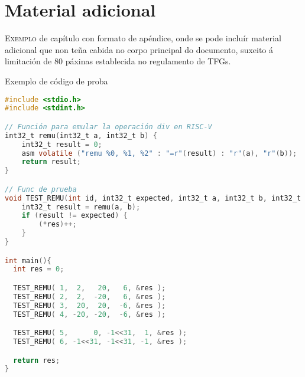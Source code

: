 \chapter{Material adicional}
\label{chap:adicional}

\lettrine{E}{xemplo} de capítulo con formato de apéndice, onde se pode
incluír material adicional que non teña cabida no corpo principal do
documento, suxeito á limitación de 80 páxinas establecida no
regulamento de TFGs.

Exemplo de código de proba

\begin{lstlisting}[language=C]
#include <stdio.h>
#include <stdint.h>

// Función para emular la operación div en RISC-V
int32_t remu(int32_t a, int32_t b) {
    int32_t result = 0;
    asm volatile ("remu %0, %1, %2" : "=r"(result) : "r"(a), "r"(b));
    return result;
}

// Func de prueba
void TEST_REMU(int id, int32_t expected, int32_t a, int32_t b, int32_t *res) {
    int32_t result = remu(a, b); 
    if (result != expected) {
        (*res)++;
    }
}

int main(){
  int res = 0;

  TEST_REMU( 1,  2,   20,   6, &res );
  TEST_REMU( 2,  2,  -20,   6, &res );
  TEST_REMU( 3,  20,  20,  -6, &res );
  TEST_REMU( 4, -20, -20,  -6, &res );

  TEST_REMU( 5,      0, -1<<31,  1, &res );
  TEST_REMU( 6, -1<<31, -1<<31, -1, &res );

  return res;
}
\end{lstlisting}
